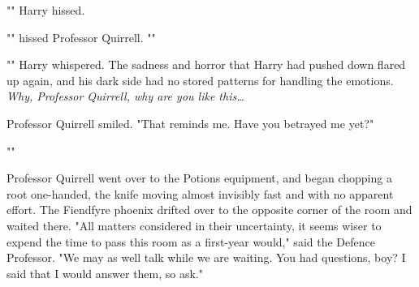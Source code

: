 "" Harry hissed.

"" hissed Professor Quirrell.
""

"" Harry whispered. The sadness and horror that Harry had pushed
down flared up again, and his dark side had no stored patterns for handling the
emotions. \emph{Why, Professor Quirrell, why are you like this{\ldots}}

Professor Quirrell smiled. "That reminds me. Have you betrayed me yet?"

""

Professor Quirrell went over to the Potions equipment, and began chopping a
root one-handed, the knife moving almost invisibly fast and with no apparent
effort. The Fiendfyre phoenix drifted over to the opposite corner of the room
and waited there. "All matters considered in their uncertainty, it seems wiser
to expend the time to pass this room as a first-year would," said the Defence
Professor. "We may as well talk while we are waiting. You had questions, boy? I
said that I would answer them, so ask."
